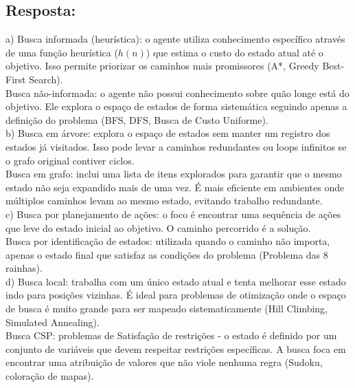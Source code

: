 \documentclass[a4paper,12pt]{article}
\begin{document}
\subsection*{Resposta:}

\bigskip

 
a) Busca informada (heurística): o agente utiliza conhecimento específico através de uma função heurística ($h(n)$) que estima o custo do estado atual até o objetivo. Isso permite priorizar os caminhos mais promissores (A*, Greedy Best-First Search).\\  

Busca não-informada: o agente não possui conhecimento sobre quão longe está do objetivo. Ele explora o espaço de estados de forma sistemática seguindo apenas a definição do problema (BFS, DFS, Busca de Custo Uniforme).\\

b) Busca em árvore: explora o espaço de estados sem manter um registro dos estados já visitados. Isso pode levar a caminhos redundantes ou loops infinitos se o grafo original contiver ciclos.\\

Busca em grafo: inclui uma lista de itens explorados para garantir que o mesmo estado não seja expandido mais de uma vez. É mais eficiente em ambientes onde múltiplos caminhos levam ao mesmo estado, evitando trabalho redundante. \\

c) Busca por planejamento de ações: o foco é encontrar uma sequência de ações que leve do estado inicial ao objetivo. O caminho percorrido é a solução. \\

Busca por identificação de estados: utilizada quando o caminho não importa, apenas o estado final que satisfaz as condições do problema (Problema das 8 rainhas). \\

d) Busca local: trabalha com um único estado atual e tenta melhorar esse estado indo para posições vizinhas. É ideal para problemas de otimização onde o espaço de busca é muito grande para ser mapeado sistematicamente (Hill Climbing, Simulated Annealing). \\

Busca CSP: problemas de Satisfação de restrições - o estado é definido por um conjunto de variáveis que devem respeitar restrições específicas. A busca foca em encontrar uma atribuição de valores que não viole nenhuma regra (Sudoku, coloração de mapas).\\
\end{document}
